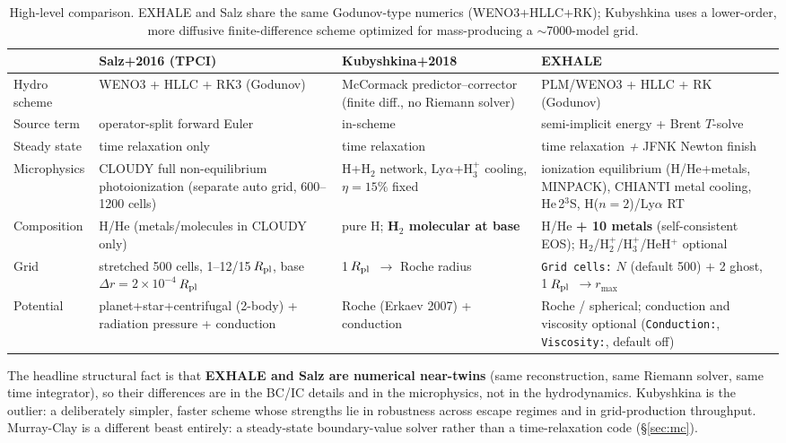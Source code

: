 \documentclass[english,a4paper]{my_memo}
\newcommand{\Rp}{$R_{\rm pl}$}
\begin{document}
\begin{table}[h]
\centering\small
\begin{tabular}{@{}p{}p{}p{}p{}@{}}
\toprule
 & \textbf{Salz+2016 (TPCI)} & \textbf{Kubyshkina+2018} & \textbf{EXHALE} \\
\midrule
Hydro scheme & WENO3 + HLLC + RK3 (Godunov) & McCormack predictor--corrector (finite diff., no Riemann solver) & PLM/WENO3 + HLLC + RK (Godunov) \\
Source term & operator-split forward Euler & in-scheme & semi-implicit energy + Brent $T$-solve \\
Steady state & time relaxation only & time relaxation & time relaxation \emph{+} JFNK Newton finish \\
Microphysics & CLOUDY full non-equilibrium photoionization (separate auto grid, 600--1200 cells) & H+H$_2$ network, Ly$\alpha$+H$_3^+$ cooling, $\eta=15\%$ fixed & ionization equilibrium (H/He+metals, MINPACK), CHIANTI metal cooling, He\,2$^3$S, H($n{=}2$)/Ly$\alpha$ RT \\
Composition & H/He (metals/molecules in CLOUDY only) & pure H; \textbf{H$_2$ molecular at base} & H/He \textbf{+ 10 metals} (self-consistent EOS); H$_2$/H$_2^+$/H$_3^+$/HeH$^+$ optional \\
Grid & stretched 500 cells, 1--12/15\,\Rp, base $\Delta r{=}2{\times}10^{-4}$\,\Rp & 1\,\Rp\ $\to$ Roche radius & \texttt{Grid cells:} $N$ (default 500) $+$ 2 ghost, 1\,\Rp\ $\to r_{\max}$ \\
Potential & planet+star+centrifugal (2-body) + radiation pressure + conduction & Roche (Erkaev 2007) + conduction & Roche / spherical; conduction and viscosity optional (\texttt{Conduction:}, \texttt{Viscosity:}, default off) \\
\bottomrule
\end{tabular}
\caption{High-level comparison. EXHALE and Salz share the same
Godunov-type numerics (WENO3+HLLC+RK); Kubyshkina uses a lower-order,
more diffusive finite-difference scheme optimized for mass-producing a
$\sim$7000-model grid.}
\end{table}

The headline structural fact is that \textbf{EXHALE and Salz are
numerical near-twins} (same reconstruction, same Riemann solver, same
time integrator), so their differences are in the BC/IC details and in
the microphysics, not in the hydrodynamics. Kubyshkina is the outlier:
a deliberately simpler, faster scheme whose strengths lie in robustness
across escape regimes and in grid-production throughput. Murray-Clay is
a different beast entirely: a steady-state boundary-value solver
rather than a time-relaxation code (\S\ref{sec:mc}).
\end{document}
